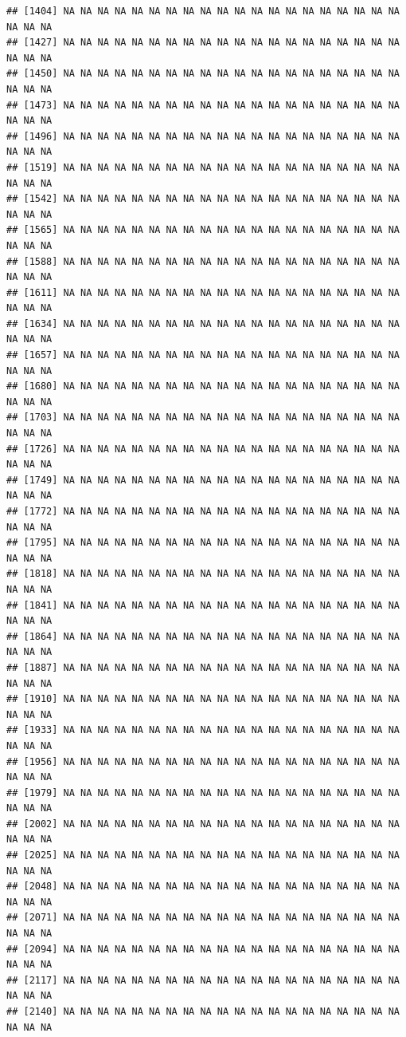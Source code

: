\documentclass{article}\usepackage[]{graphicx}\usepackage[]{color}
\makeatletter
\newenvironment{kframe}{%
 \def\at@end@of@kframe{}%
 \ifinner\ifhmode%
  \def\at@end@of@kframe{\end{minipage}}%
  \begin{minipage}{\columnwidth}%
 \fi\fi%
 \def\FrameCommand##1{\hskip\@totalleftmargin \hskip-\fboxsep
 \colorbox{shadecolor}{##1}\hskip-\fboxsep
     \hskip-\linewidth \hskip-\@totalleftmargin \hskip\columnwidth}%
 \MakeFramed {\advance\hsize-\width
   \@totalleftmargin\z@ \linewidth\hsize
   \@setminipage}}%
 {\par\unskip\endMakeFramed%
 \at@end@of@kframe}
\newenvironment{knitrout}{}{} %
\makeatother
\begin{document}
\begin{knitrout}
\begin{kframe}
\begin{verbatim}
## [1404] NA NA NA NA NA NA NA NA NA NA NA NA NA NA NA NA NA NA NA NA NA NA NA
## [1427] NA NA NA NA NA NA NA NA NA NA NA NA NA NA NA NA NA NA NA NA NA NA NA
## [1450] NA NA NA NA NA NA NA NA NA NA NA NA NA NA NA NA NA NA NA NA NA NA NA
## [1473] NA NA NA NA NA NA NA NA NA NA NA NA NA NA NA NA NA NA NA NA NA NA NA
## [1496] NA NA NA NA NA NA NA NA NA NA NA NA NA NA NA NA NA NA NA NA NA NA NA
## [1519] NA NA NA NA NA NA NA NA NA NA NA NA NA NA NA NA NA NA NA NA NA NA NA
## [1542] NA NA NA NA NA NA NA NA NA NA NA NA NA NA NA NA NA NA NA NA NA NA NA
## [1565] NA NA NA NA NA NA NA NA NA NA NA NA NA NA NA NA NA NA NA NA NA NA NA
## [1588] NA NA NA NA NA NA NA NA NA NA NA NA NA NA NA NA NA NA NA NA NA NA NA
## [1611] NA NA NA NA NA NA NA NA NA NA NA NA NA NA NA NA NA NA NA NA NA NA NA
## [1634] NA NA NA NA NA NA NA NA NA NA NA NA NA NA NA NA NA NA NA NA NA NA NA
## [1657] NA NA NA NA NA NA NA NA NA NA NA NA NA NA NA NA NA NA NA NA NA NA NA
## [1680] NA NA NA NA NA NA NA NA NA NA NA NA NA NA NA NA NA NA NA NA NA NA NA
## [1703] NA NA NA NA NA NA NA NA NA NA NA NA NA NA NA NA NA NA NA NA NA NA NA
## [1726] NA NA NA NA NA NA NA NA NA NA NA NA NA NA NA NA NA NA NA NA NA NA NA
## [1749] NA NA NA NA NA NA NA NA NA NA NA NA NA NA NA NA NA NA NA NA NA NA NA
## [1772] NA NA NA NA NA NA NA NA NA NA NA NA NA NA NA NA NA NA NA NA NA NA NA
## [1795] NA NA NA NA NA NA NA NA NA NA NA NA NA NA NA NA NA NA NA NA NA NA NA
## [1818] NA NA NA NA NA NA NA NA NA NA NA NA NA NA NA NA NA NA NA NA NA NA NA
## [1841] NA NA NA NA NA NA NA NA NA NA NA NA NA NA NA NA NA NA NA NA NA NA NA
## [1864] NA NA NA NA NA NA NA NA NA NA NA NA NA NA NA NA NA NA NA NA NA NA NA
## [1887] NA NA NA NA NA NA NA NA NA NA NA NA NA NA NA NA NA NA NA NA NA NA NA
## [1910] NA NA NA NA NA NA NA NA NA NA NA NA NA NA NA NA NA NA NA NA NA NA NA
## [1933] NA NA NA NA NA NA NA NA NA NA NA NA NA NA NA NA NA NA NA NA NA NA NA
## [1956] NA NA NA NA NA NA NA NA NA NA NA NA NA NA NA NA NA NA NA NA NA NA NA
## [1979] NA NA NA NA NA NA NA NA NA NA NA NA NA NA NA NA NA NA NA NA NA NA NA
## [2002] NA NA NA NA NA NA NA NA NA NA NA NA NA NA NA NA NA NA NA NA NA NA NA
## [2025] NA NA NA NA NA NA NA NA NA NA NA NA NA NA NA NA NA NA NA NA NA NA NA
## [2048] NA NA NA NA NA NA NA NA NA NA NA NA NA NA NA NA NA NA NA NA NA NA NA
## [2071] NA NA NA NA NA NA NA NA NA NA NA NA NA NA NA NA NA NA NA NA NA NA NA
## [2094] NA NA NA NA NA NA NA NA NA NA NA NA NA NA NA NA NA NA NA NA NA NA NA
## [2117] NA NA NA NA NA NA NA NA NA NA NA NA NA NA NA NA NA NA NA NA NA NA NA
## [2140] NA NA NA NA NA NA NA NA NA NA NA NA NA NA NA NA NA NA NA NA NA NA NA

\end{verbatim}
\end{kframe}
\end{knitrout}
\end{document}
